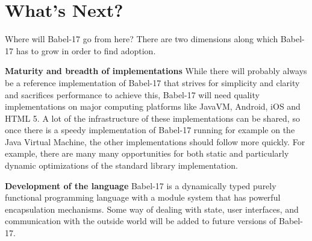 \documentclass[11pt]{amsart}
\begin{document}
\section{What's Next?}

Where will Babel-17 go from here? There are two dimensions along which Babel-17 has to grow in order to find adoption.

\vspace{0.2cm}
\noindent\textbf{Maturity and breadth of implementations}
While there will probably always be a reference implementation of Babel-17 that strives for simplicity and clarity and sacrifices performance to achieve this, Babel-17 will need quality implementations on major computing platforms like JavaVM, Android, iOS and HTML 5. A lot of the infrastructure of these implementations can be shared, so once there is a speedy implementation of Babel-17 running for example on the Java Virtual Machine, the other implementations should follow more quickly. For example, there are many many opportunities for both static and particularly dynamic optimizations of the standard library implementation.

\vspace{0.2cm}
\noindent\textbf{Development of the language} 
Babel-17 is a dynamically typed purely functional programming language with a module system that has powerful encapsulation mechanisms.
Some way of dealing with state, user interfaces, and communication with the outside world will be added to future versions of Babel-17. 
\end{document}
